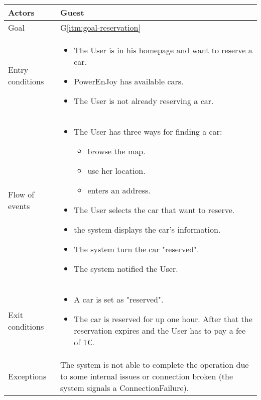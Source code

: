 \begin{center}
  \begin{tabular}{ l | p{10cm} }
    \hline
    Actors & Guest\\ \hline
    Goal & G\ref{itm:goal-reservation}\\ \hline
    Entry conditions & \begin{itemize}
			\item The User is in his homepage and want to reserve a car.
			\item PowerEnJoy has available cars.
			\item The User is not already reserving a car.
\end{itemize}  \\ \hline
    Flow of events &
\begin{itemize}
\item The User has three ways for finding a car:
\begin{itemize}
			\item browse the map.
			\item use her location.
			\item enters an address.
\end{itemize}
\item The User selects the car that want to reserve.
\item the system displays the car's information.%
\item The system turn the car "reserved".%
\item The system notified the User.
\end{itemize} \\ \hline
    Exit conditions &
\begin{itemize}
	\item A car is set as "reserved".
	\item The car is reserved for up one hour. After that the reservation expires and the User has to pay a fee of 1€.
\end{itemize}  \\ \hline
  Exceptions & 

The system is not able to complete the operation due to some internal issues or connection broken (the system signals a ConnectionFailure).%
\\ \hline
  \end{tabular}
\end{center}



